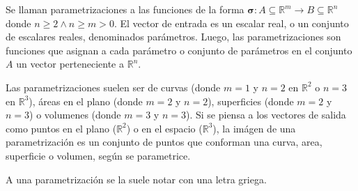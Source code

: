\begin{definition}[Parametrización]
    Se llaman parametrizaciones a las funciones de la forma $\boldsymbol{\sigma}:A\subseteq\mathbb{R}^m\rightarrow B\subseteq\mathbb{R}^n$
    donde $n\geq2 \land n\geq m>0$. El vector de entrada es un escalar real, o un conjunto de escalares reales, denominados parámetros.
    Luego, las parametrizaciones son funciones que asignan a cada parámetro o conjunto de parámetros en el conjunto $A$
    un vector perteneciente a $\mathbb{R}^n$. 
    
    Las parametrizaciones suelen ser de curvas (donde $m=1$ y $n=2$ en $\mathbb{R}^2$ o $n=3$ en $\mathbb{R}^3$),
    áreas en el plano (donde $m=2$ y $n=2$), superficies (donde $m=2$ y $n=3$) o volumenes (donde $m=3$ y $n=3$).
    Si se piensa a los vectores de salida como puntos en el plano ($\mathbb{R}^2$) o en el espacio ($\mathbb{R}^3$),
    la imágen de una parametrización es un conjunto de puntos que conforman una curva, area, superficie o volumen, según se parametrice.

    A una parametrización se la suele notar con una letra griega.


\end{definition}
